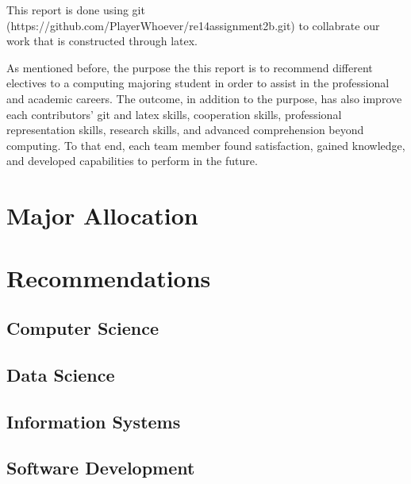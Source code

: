 \documentclass{article}
\begin{document}
	This report is done using git (https://github.com/PlayerWhoever/re14assignment2b.git) to collabrate our work that is constructed through latex. \par
	As mentioned before, the purpose the this report is to recommend different electives to a computing majoring student in order to assist in the professional and academic careers. The outcome, in addition to the purpose, has also improve each contributors’ git and latex skills, cooperation skills, professional representation skills, research skills, and  advanced comprehension beyond computing. To that end, each team member found satisfaction, gained knowledge, and developed capabilities to perform in the future.
	\pagebreak

\section{Major Allocation}
	\begin{center}
	\end{center}
\pagebreak

\section{Recommendations}
	\subsection{Computer Science}
		
		\pagebreak
	\subsection{Data Science}
		
		\pagebreak
	\subsection{Information Systems}
		
		\pagebreak
	\subsection{Software Development}
		
		\pagebreak
\end{document}
